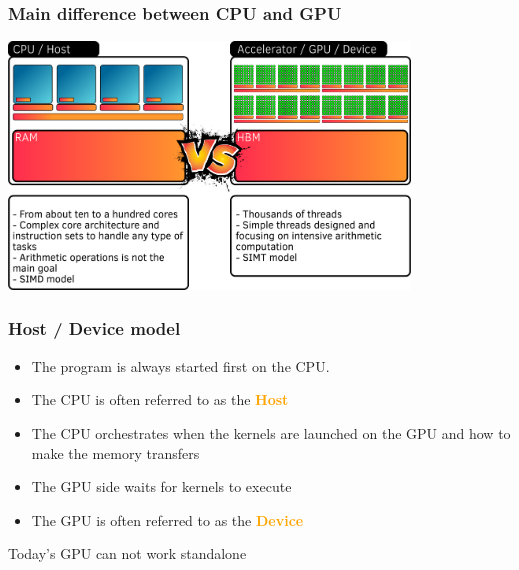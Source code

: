 \documentclass[aspectratio=169]{beamer}
\newcommand{\highlight}[1]{\textcolor{orange}{\textbf{#1}}}
\begin{document}

\begin{frame}
    \frametitle{Main difference between CPU and GPU}

    \begin{center}
        \includegraphics[width=0.8\textwidth]{../../images/cpu_vs_gpu.png}
    \end{center}

\end{frame}


\begin{frame}
    \frametitle{Host / Device model}

    \begin{itemize}
        \item The program is always started first on the CPU.
        \item The CPU is often referred to as the \highlight{Host}
        \item The CPU orchestrates when the kernels are launched on the GPU and how to make the memory transfers
        \item The GPU side waits for kernels to execute
        \item The GPU is often referred to as the \highlight{Device}
    \end{itemize}

    \begin{alertblock}{}
        Today's GPU can not work standalone
    \end{alertblock}

\end{frame}

\end{document}
